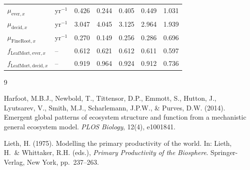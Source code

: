 \documentclass[12pt]{article}
\begin{document}
\begin{landscape}
\begin{table}[ht]
\begin{tabular}{llccccc}
$\mu_{\mathrm{ever},x}$                    & yr$^{-1}$               & 0.426 & 0.244   & 0.405 & 0.449 & 1.031 \\
$\mu_{\mathrm{decid},x}$                   & yr$^{-1}$               & 3.047 & 4.045   & 3.125 & 2.964 & 1.939 \\
$\mu_{\mathrm{FineRoot},x}$                & yr$^{-1}$               & 0.270 & 0.149   & 0.256 & 0.286 & 0.696 \\
$f_{\mathrm{LeafMort,ever},x}$             & --                      & 0.612 & 0.621   & 0.612 & 0.611 & 0.597 \\
$f_{\mathrm{LeafMort,decid},x}$            & --                      & 0.919 & 0.964   & 0.924 & 0.912 & 0.736 \\
\bottomrule
\end{tabular}
\end{table}
\end{landscape}

\begin{thebibliography}{9}

Harfoot, M.B.J., Newbold, T., Tittensor, D.P., Emmott, S., Hutton, J.,
Lyutsarev, V., Smith, M.J., Scharlemann, J.P.W., \& Purves, D.W. (2014).
Emergent global patterns of ecosystem structure and function from a mechanistic
general ecosystem model.
\textit{PLOS Biology}, 12(4), e1001841.

Lieth, H. (1975).
Modelling the primary productivity of the world.
In: Lieth, H.\ \& Whittaker, R.H. (eds.),
\textit{Primary Productivity of the Biosphere}.
Springer-Verlag, New York, pp.\ 237--263.

\end{thebibliography}
\end{document}
